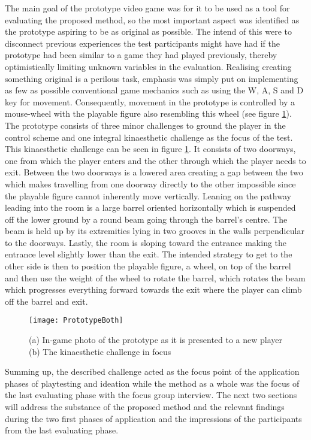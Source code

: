 The main goal of the prototype video game was for it to be used as a tool for evaluating the proposed method, so the most important aspect was identified as the prototype aspiring to be as original as possible. The intend of this were to disconnect previous experiences the test participants might have had if the prototype had been similar to a game they had played previously, thereby optimistically limiting unknown variables in the evaluation. Realising creating something original is a perilous task, emphasis was simply put on implementing as few as possible conventional game mechanics such as using the W, A, S and D key for movement. Consequently, movement in the prototype is controlled by a mouse-wheel with the playable figure also resembling this wheel (see figure \ref{prototype}). The prototype consists of three minor challenges to ground the player in the control scheme and one integral kinaesthetic challenge as the focus of the test. This kinaesthetic challenge can be seen in figure \ref{prototype}. It consists of two doorways, one from which the player enters and the other through which the player needs to exit. Between the two doorways is a lowered area creating a gap between the two which makes travelling from one doorway directly to the other impossible since the playable figure cannot inherently move vertically. Leaning on the pathway leading into the room is a large barrel oriented horizontally which is suspended off the lower ground by a round beam going through the barrel's centre. The beam is held up by its extremities lying in two grooves in the walls perpendicular to the doorways. Lastly, the room is sloping toward the entrance making the entrance level slightly lower than the exit. The intended strategy to get to the other side is then to position the playable figure, a wheel, on top of the barrel and then use the weight of the wheel to rotate the barrel, which rotates the beam which progresses everything forward towards the exit where the player can climb off the barrel and exit.

\begin{figure}[h]
  \texttt{[image: PrototypeBoth]}
  \caption{(a) In-game photo of the prototype as it is presented to a new player (b) The kinaesthetic challenge in focus}
  \label{prototype}
\end{figure}

Summing up, the described challenge acted as the focus point of the application phases of playtesting and ideation while the method as a whole was the focus of the last evaluating phase with the focus group interview. The next two sections will address the substance of the proposed method and the relevant findings during the two first phases of application and the impressions of the participants from the last evaluating phase.

